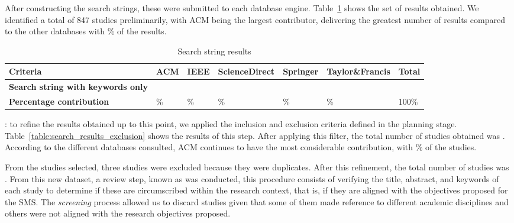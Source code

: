 After constructing the search strings, these were submitted to each database engine. Table~\ref{table:search_results} shows the set of results obtained. We identified a total of 847 studies preliminarily, with ACM being the largest contributor, delivering the greatest number of results compared to the other databases with \acmp\% of the results.


\begin{table}[htbp]
	\centering
	\caption{Search string results}
	\label{table:search_results}
	\renewcommand{\arraystretch}{1}  %
	\begin{tabular}{p{4.8cm}p{1.7cm}p{1.7cm}p{1.7cm}p{1.7cm}p{2cm}p{1.4cm}}
		\toprule
		\textbf{Criteria}                         & \textbf{ACM} & \textbf{IEEE} & \textbf{ScienceDirect} & \textbf{Springer} & \textbf{Taylor\&Francis} & \textbf{Total} \\
		\midrule
		\textbf{Search string with keywords only} & \acm{}       & \ieee{}       & \sd{}                  & \spr{}            & \tf{}                    & \tot{}         \\
		\addlinespace[0.8em]
		\textbf{Percentage contribution}          & \acmp{}\%    & \ieeep{}\%    & \sdp{}\%               & \sprp{}\%         & \tfp{}\%                 & 100\%          \\
		\bottomrule
	\end{tabular}
\end{table}




: to refine the results obtained up to this point, we applied the inclusion and exclusion criteria defined in the planning stage. Table~\ref{table:search_results_exclusion} shows the results of this step. After applying this filter, the total number of studies obtained was \itot. According to the different databases consulted, ACM continues to have the most considerable contribution, with \iacmp\% of the studies.


From the \itot{} studies selected, three studies were excluded because they were duplicates. After this refinement, the total number of studies was \depTot{}. From this new dataset, a review step, known as  was conducted, this procedure consists of verifying the title, abstract, and keywords of each study to determine if these are circumscribed within the research context, that is, if they are aligned with the objectives proposed for the SMS. The \textit{screening} process allowed us to discard \screen{} studies given that some of them made reference to different academic disciplines and others were not aligned with the research objectives proposed.


